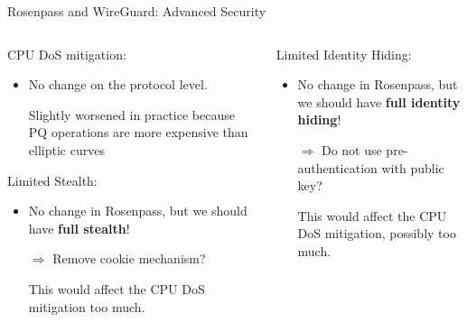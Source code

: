 \begin{frame}{Rosenpass and WireGuard: Advanced Security}
\vspace*{-\baselineskip}
\small
\begin{columns}[fullwidth,T]
	\setlength{}
  \begin{column}{.48\linewidth}
    \begin{block}{\strut CPU DoS mitigation:}
    \begin{itemize}
      \item No change on the protocol level.
      \item[{\Sey[][green!60!white]} ] Slightly worsened in practice because PQ operations are more expensive than elliptic curves
    \end{itemize}
        \unskip
    \end{block}
    \begin{block}{\strut Limited Stealth:}
    \begin{itemize}
      \item No change in Rosenpass, but we should have \textbf{full stealth}!
      \item[$\Rightarrow$] Remove cookie mechanism?
      \item[{\Sey[][green!60!white]} ] This would affect the CPU DoS mitigation too much.
    \end{itemize}
    \unskip
    \end{block}

  \end{column}

  \begin{column}{.48\linewidth}
    \begin{block}{\strut Limited Identity Hiding:}
    \begin{itemize}
      \item No change in Rosenpass, but we should have \textbf{full identity hiding}!
      \item[$\Rightarrow$] Do not use pre-authentication with public key?
      \item[{\Sey[][green!60!white]} ] This would affect the CPU DoS mitigation, possibly too much.
    \end{itemize}
        \unskip
    \end{block}
  \end{column}
\end{columns}
\end{frame}

